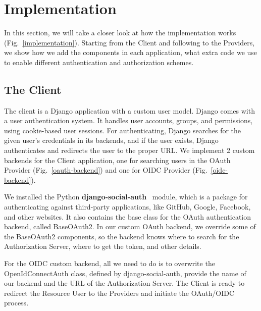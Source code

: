 \section{Implementation}

In this section, we will take a closer look at how the implementation works (Fig.~\ref{implementation}). Starting from the Client and following to the Providers, we show how we add the components in each application, what extra code we use to enable different authentication and authorization schemes.


\subsection{The Client}

The client is a Django application with a custom user model. Django comes with a user authentication system. It handles user accounts, groups, and permissions, using cookie-based user sessions. For authenticating, Django searches for the given user's credentials in its backends, and if the user exists, Django authenticates and redirects the user to the proper URL. We implement 2 custom backends for the Client application, one for searching users in the OAuth Provider (Fig.~\ref{oauth-backend}) and one for OIDC Provider (Fig.~\ref{oidc-backend}).

We installed the Python \textbf{django-social-auth}~\cite{djangosocial} module, which is a package for authenticating against third-party applications, like GitHub, Google, Facebook, and other websites. It also contains the base class for the OAuth authentication backend, called BaseOAuth2. In our custom OAuth backend, we override some of the BaseOAuth2 components, so the backend knows where to search for the Authorization Server, where to get the token, and other details.

For the OIDC custom backend, all we need to do is to overwrite the OpenIdConnectAuth class, defined by django-social-auth, provide the name of our backend and the URL of the Authorization Server. The Client is ready to redirect the Resource User to the Providers and initiate the OAuth/OIDC process.


